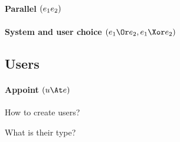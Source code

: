 \paragraph{Parallel $(e_1 \relax e_2)$}




\paragraph{System and user choice $(e_1 \Or e_2, e_1 \Xor e_2)$}




\subsection{Users}

\paragraph{Appoint $(u \At e)$}

\begin{itemize*}
  \item How to create users?
  \item What is their type?
\end{itemize*}
